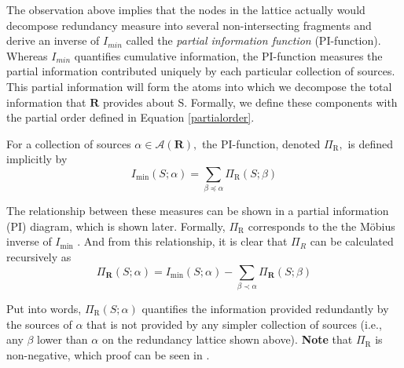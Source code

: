 The observation above implies that the nodes in the lattice actually would decompose redundancy measure into several non-intersecting fragments and derive an inverse of ${I}_{min}$ called the \textit{partial information function} (PI-function). Whereas ${I}_{min}$ quantifies cumulative information, the PI-function measures the partial information contributed uniquely by each particular collection of sources. This partial information will form the atoms into which we decompose the total information
that $\mathbf{R}$ provides about S. Formally, we define these components with the partial order defined in Equation  \ref{partialorder}.

\begin{definition}For a collection of sources $\alpha \in \mathcal{A}(\mathbf{R}),$ the PI-function, denoted $\Pi_{\mathrm{R}},$ is defined implicitly by
\begin{equation}
    I_{\min }(S ; \alpha)=\sum_{\beta \preccurlyeq \alpha} \Pi_{\mathrm{R}}(S ; \beta)
    \label{def:partial}
\end{equation}


\end{definition}


The relationship between these measures can be shown in a partial information (PI) diagram, which is shown later. Formally, $\Pi_{\mathrm{R}}$ corresponds to the the Möbius inverse of $I_{\min }$ \cite{stanley1997enumerative}. And from this relationship, it is clear that $\Pi_{R}$ can be calculated recursively as
\begin{equation}
    \Pi_{\mathbf{R}}(S ; \alpha)=I_{\min }(S ; \alpha)-\sum_{\beta \prec \alpha} \Pi_{\mathbf{R}}(S ; \beta)
\end{equation}

Put into words, $\Pi_{\mathrm{R}}(S ; \alpha)$ quantifies the information provided redundantly by the sources of $\alpha$ that is not provided by any simpler collection of sources (i.e., any $\beta$ lower than $\alpha$ on the redundancy lattice shown above). \textbf{Note} that $\Pi_{\mathrm{R}}$ is non-negative, which proof can be seen in \cite{Williams2010Nonnegative}.

\label{thm:nonneg}




